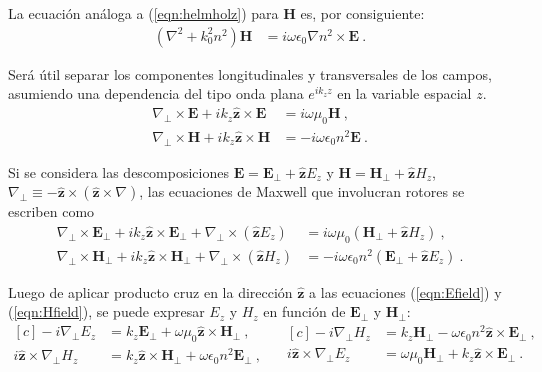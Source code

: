 La ecuación análoga a (\ref{eqn:helmholz}) para \textbf{H} es, por consiguiente:
\begin{align}
	 \left(\nabla^2  + k_0^2 n^2 \right) \textbf{H} &= i\omega \epsilon_0 \nabla n^2 \times \textbf{E} \ .
	 \label{eqn:helmholzH}
\end{align}

Será útil separar los componentes longitudinales y transversales de los campos, asumiendo una dependencia del tipo onda plana $e^{ik_z z}$ en la variable espacial $z$. 
\begin{align}
	\nabla_\perp \times  \textbf{E} + ik_z \hat{\textbf{z}} \times \textbf{E} &= i\omega\mu_0\textbf{H} \ ,
	\label{eqn:EfieldH}
	\\
	\nabla_\perp \times  \textbf{H} + ik_z \hat{\textbf{z}} \times \textbf{H} &= -i\omega \epsilon_0 n^2 \textbf{E} \ .
	\label{eqn:HfieldE}
\end{align}

Si se considera las descomposiciones $\textbf{E}=\textbf{E}_\perp +\hat{\textbf{z}} E_z$ y $\textbf{H}=\textbf{H}_\perp +\hat{\textbf{z}} H_z$, $\nabla_\perp \equiv - \hat{\textbf{z}}\times (\hat{\textbf{z}}\times\nabla)   $, las ecuaciones de Maxwell que involucran rotores se escriben como
\begin{align}
	\nabla_\perp \times  \textbf{E}_\perp + ik_z \hat{\textbf{z}} \times \textbf{E}_\perp + \nabla_\perp \times (\hat{\textbf{z}} E_z) &= i\omega\mu_0(\textbf{H}_\perp +\hat{\textbf{z}} H_z) \ ,
	\label{eqn:Efield}
	\\
	\nabla_\perp \times  \textbf{H}_\perp + ik_z \hat{\textbf{z}} \times \textbf{H}_\perp + \nabla_\perp \times (\hat{\textbf{z}} H_z) &= -i\omega \epsilon_0 n^2 (\textbf{E}_\perp +\hat{\textbf{z}} E_z) \ .
	\label{eqn:Hfield}
\end{align}

Luego de aplicar producto cruz en la dirección $\hat{\textbf{z}}$ a las ecuaciones (\ref{eqn:Efield}) y (\ref{eqn:Hfield}), se puede expresar $E_z$ y $H_z$ en función de $\textbf{E}_\perp$ y $\textbf{H}_\perp$:
\begin{equation*}
\begin{aligned}[c]
	 -i\nabla_\perp E_z &= k_z\textbf{E}_\perp +\omega \mu_0 \hat{\textbf{z}} \times \textbf{H}_\perp \ ,
	 	  	 \\
	 	  	i\hat{\textbf{z}} \times \nabla_\perp H_z &= k_z \hat{\textbf{z}} \times\textbf{H}_\perp + \omega\epsilon_0 n^2 \textbf{E}_\perp \ ,
\end{aligned} 
\quad
\begin{aligned}[c]
	-i \nabla_\perp H_z &= k_z \textbf{H}_\perp - \omega \epsilon_0 n^2  \hat{\textbf{z}} \times \textbf{E}_\perp \ ,
	\\
	i\hat{\textbf{z}} \times\nabla_\perp E_z &=  \omega \mu_0 \textbf{H}_\perp+k_z  \hat{\textbf{z}} \times \textbf{E}_\perp \ .
\end{aligned}
\end{equation*}

